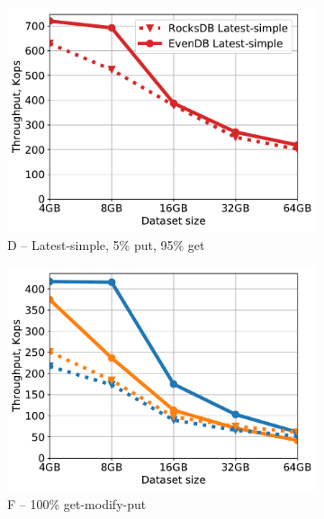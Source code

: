 \begin{figure}[tb]
\begin{subfigure}{0.3\linewidth}
\includegraphics[width=\textwidth]{figs/Workload_D_line.pdf}
\caption{D -- Latest-simple, 5\% put, 95\% get}
\label{fig:throughput:d}
\end{subfigure}
\begin{subfigure}{0.3\linewidth}
\includegraphics[width=\textwidth]{figs/Workload_F_line.pdf}
\caption{F -- 100\% get-modify-put}
\label{fig:throughput:f}
\end{subfigure}
\hspace{70pt}
\begin{subfigure}{0.3\linewidth}

\end{subfigure}
\end{figure}
